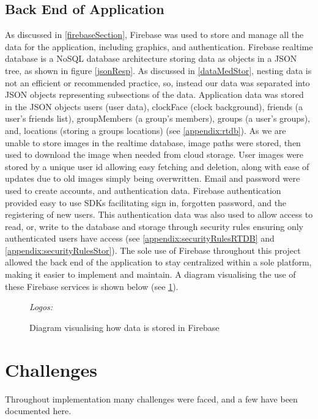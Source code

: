 \subsection{Back End of Application}
As discussed in \ref{firebaseSection}, Firebase was used to store and manage all the data for the application, including graphics, and authentication. Firebase realtime database is a NoSQL database architecture storing data as objects in a JSON tree, as shown in figure \ref{jsonResp}. As discussed in \ref{dataMedStor}, nesting data is not an efficient or recommended practice, so, instead our data was separated into JSON objects representing subsections of the data. Application data was stored in the JSON objects users (user data), clockFace (clock background), friends (a user's friends list), groupMembers (a group's members), groups (a user's groups), and, locations (storing a groups locations) (see \ref{appendix:rtdb}). As we are unable to store images in the realtime database, image paths were stored, then used to download the image when needed from cloud storage. User images were stored by a unique user id allowing easy fetching and deletion, along with ease of updates due to old images simply being overwritten. Email and password were used to create accounts, and authentication data. Firebase authentication provided easy to use SDKs facilitating sign in, forgotten password, and the registering of new users. This authentication data was also used to allow access to read, or, write to the database and storage through security rules ensuring only authenticated users have access (see \ref{appendix:securityRulesRTDB} and \ref{appendix:securityRulesStor}). The sole use of Firebase throughout this project allowed the back end of the application to stay centralized within a sole platform, making it easier to implement and maintain. A diagram visualising the use of these Firebase services is shown below (see \ref{fig:firebaseDiag}).
\begin{figure}[!htbp]
    \centering
    \begin{subfigure}[b]{\textwidth}
    \end{subfigure}
    \caption{Diagram visualising how data is stored in Firebase} \small\textit{{Logos: \cite{storImg, rtdbImg, authImg}}}
    \label{fig:firebaseDiag}
\end{figure}
\FloatBarrier
\section{Challenges}
Throughout implementation many challenges were faced, and a few have been documented here.
